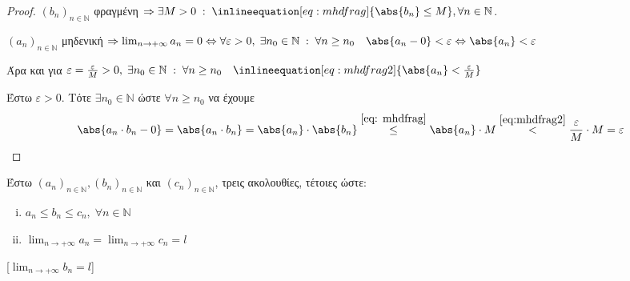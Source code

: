\documentclass[main.tex]{subfiles}
\begin{document}
\begin{proof}
\item {}
    $ (b_{n})_{n \in \mathbb{N}} $ φραγμένη $ \Rightarrow \exists M>0 
    \; : \; \inlineequation[eq: mhdfrag]{\abs{b_{n}} \leq M}, 
    \forall n \in \mathbb{N} $.

    $ (a_{n})_{n \in \mathbb{N}} $ μηδενική $ \Rightarrow 
    \lim_{n \to +\infty} a_{n} = 0 \Leftrightarrow  \forall 
    \varepsilon >0, \; \exists n_{0} \in \mathbb{N} \; : \; \forall 
    n \geq n_{0} \quad \abs{a_{n}-0} < \varepsilon \Leftrightarrow 
    \abs{a_{n}} < \varepsilon $ 

    Άρα και για $ \varepsilon = \frac{\varepsilon}{M} >0, \; 
    \exists n_{0} \in \mathbb{N} \; : \; 
    \forall n \geq n_{0} \quad 
    \inlineequation[eq:mhdfrag2]{\abs{a_{n}} < \frac{\varepsilon}{M}} $ 

    Έστω $ \varepsilon >0 $. Τότε $ \exists n_{0} \in \mathbb{N} $ 
    ώστε $ \forall n \geq n_{0} $ να έχουμε 
    \[
        \abs{a_{n}\cdot b_{n} - 0} = \abs{a_{n}\cdot b_{n} } 
        = \abs{a_{n}} \cdot \abs{b_{n}} 
        \overset{\eqref{eq: mhdfrag}}{\leq} \abs{a_{n}} \cdot M 
        \overset{\eqref{eq:mhdfrag2}}{<} 
        \frac{\varepsilon}{M} \cdot M = \varepsilon
    \]
\end{proof}

\begin{prop}
\item {}
    Έστω $ (a_{n})_{n \in \mathbb{N}}, (b_{n})_{n \in \mathbb{N}} $ και 
    $ (c_{n})_{n \in \mathbb{N}} $, τρεις ακολουθίες, τέτοιες ώστε:

    \vspace{\baselineskip}

    \begin{minipage}{0.3\textwidth}
        \begin{enumerate}[i)]
            \item $ a_{n} \leq b_{n} \leq c_{n}, \; \forall n \in 
                \mathbb{N} $ \hfill {} 
            \item $ \lim_{n \to +\infty} a_{n} = \lim_{n \to +\infty} 
                c_{n} = l $ \hfill {}
        \end{enumerate}
    \end{minipage}

    [$ \lim_{n \to +\infty} b_{n} = l$]
\end{prop}
\end{document}
